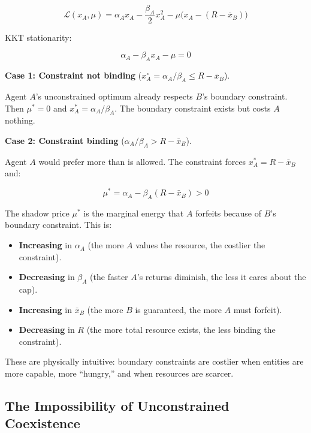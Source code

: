 \documentclass[11pt]{article}
\theoremstyle{plain}
\theoremstyle{definition}
\theoremstyle{remark}
\let\origsubsection\subsection
\renewcommand{\subsection}{\needspace{7\baselineskip}\origsubsection}
\providecommand{\tightlist}{%
  \setlength{\itemsep}{0pt}\setlength{\parskip}{0pt}}
\begin{document}
\[\mathcal{L}(x_A, \mu) = \alpha_A x_A - \frac{\beta_A}{2} x_A^2 - \mu\bigl(x_A - (R - \bar{x}_B)\bigr)\]

KKT stationarity:

\[\alpha_A - \beta_A x_A - \mu = 0\]

\textbf{Case 1: Constraint not binding}
(\(x_A^{\circ} = \alpha_A / \beta_A \leq R - \bar{x}_B\)).

Agent \(A\)'s unconstrained optimum already respects \(B\)'s boundary
constraint. Then \(\mu^* = 0\) and \(x_A^* = \alpha_A / \beta_A\). The
boundary constraint exists but costs \(A\) nothing.

\textbf{Case 2: Constraint binding}
(\(\alpha_A / \beta_A > R - \bar{x}_B\)).

Agent \(A\) would prefer more than is allowed. The constraint forces
\(x_A^* = R - \bar{x}_B\) and:

\[\mu^* = \alpha_A - \beta_A(R - \bar{x}_B) > 0\]

The shadow price \(\mu^*\) is the marginal energy that \(A\) forfeits
because of \(B\)'s boundary constraint. This is:

\begin{itemize}
\tightlist
\item
  \textbf{Increasing} in \(\alpha_A\) (the more \(A\) values the
  resource, the costlier the constraint).
\item
  \textbf{Decreasing} in \(\beta_A\) (the faster \(A\)'s returns
  diminish, the less it cares about the cap).
\item
  \textbf{Increasing} in \(\bar{x}_B\) (the more \(B\) is guaranteed,
  the more \(A\) must forfeit).
\item
  \textbf{Decreasing} in \(R\) (the more total resource exists, the less
  binding the constraint).
\end{itemize}

These are physically intuitive: boundary constraints are costlier when
entities are more capable, more ``hungry,'' and when resources are
scarcer.

\subsection{The Impossibility of Unconstrained
Coexistence}\label{the-impossibility-of-unconstrained-coexistence}
\end{document}
